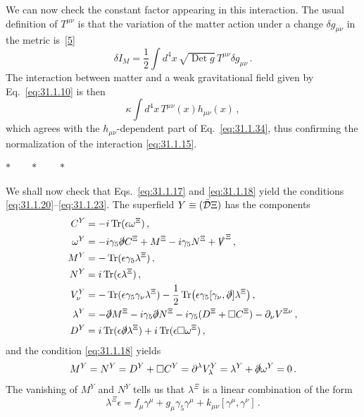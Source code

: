 We can now check the constant factor appearing in this interaction. The usual
definition of \(T^{\mu\nu}\) is that the variation of the matter action under
a change \(\delta g_{\mu\nu}\) in the metric
is~\hyperref[ch31-ref-5]{[5]}
\[
  \delta I_M
  =\frac12\int d^4x\,\sqrt{\operatorname{Det}g}\,
    T^{\mu\nu}\delta g_{\mu\nu}\,.
\]
The interaction between matter and a weak gravitational field given by
Eq.~\eqref{eq:31.1.10} is then
\[
  \kappa\int d^4x\,T^{\mu\nu}(x)h_{\mu\nu}(x)\,,
\]
which agrees with the \(h_{\mu\nu}\)-dependent part of
Eq.~\eqref{eq:31.1.34}, thus confirming the normalization of the interaction
\eqref{eq:31.1.15}.

\begin{center}
\(\ast\qquad\ast\qquad\ast\)
\end{center}

We shall now check that Eqs.~\eqref{eq:31.1.17} and \eqref{eq:31.1.18} yield
the conditions \eqref{eq:31.1.20}--\eqref{eq:31.1.23}. The superfield
\(Y\equiv(\bar{\SuperD}\Xi)\) has the components
\[
  \begin{aligned}
  C^Y&=-i\operatorname{Tr}(\epsilon\omega^\Xi)\,,
  \\
  \omega^Y
  &=-i\gamma_5\sl{\partial}C^\Xi
    +M^\Xi-i\gamma_5N^\Xi+\sl{V}^\Xi\,,
  \\
  M^Y&=-\operatorname{Tr}(\epsilon\gamma_5\lambda^\Xi)\,,
  \\
  N^Y&=i\operatorname{Tr}(\epsilon\lambda^\Xi)\,,
  \\
  V_\nu^Y
  &=-\operatorname{Tr}(\epsilon\gamma_5\gamma_\nu\lambda^\Xi)
    -\frac12\operatorname{Tr}
      \bigl(\epsilon\gamma_5[\gamma_\nu,\sl{\partial}]\lambda^\Xi\bigr)\,,
  \\
  \lambda^Y
  &=-\sl{\partial}M^\Xi-i\gamma_5\sl{\partial}N^\Xi
    -i\gamma_5(D^\Xi+\Box C^\Xi)-\partial_\nu V^{\Xi\nu}\,,
  \\
  D^Y
  &=i\operatorname{Tr}(\epsilon\sl{\partial}\lambda^\Xi)
    +i\operatorname{Tr}(\epsilon\Box\omega^\Xi)\,,
  \end{aligned}
\]
and the condition \eqref{eq:31.1.18} yields
\[
  M^Y=N^Y=D^Y+\Box C^Y
  =\partial^\lambda V_\lambda^Y
  =\lambda^Y+\sl{\partial}\omega^Y=0\,.
\]
The vanishing of \(M^Y\) and \(N^Y\) tells us that \(\lambda^\Xi\) is a
linear combination of the form
\begin{equation}
  \lambda^\Xi\epsilon
  =f_\mu\gamma^\mu+g_\mu\gamma_5\gamma^\mu
   +k_{\mu\nu}[\gamma^\mu,\gamma^\nu]\,.
  \tag{31.1.35}\label{eq:31.1.35}
\end{equation}
